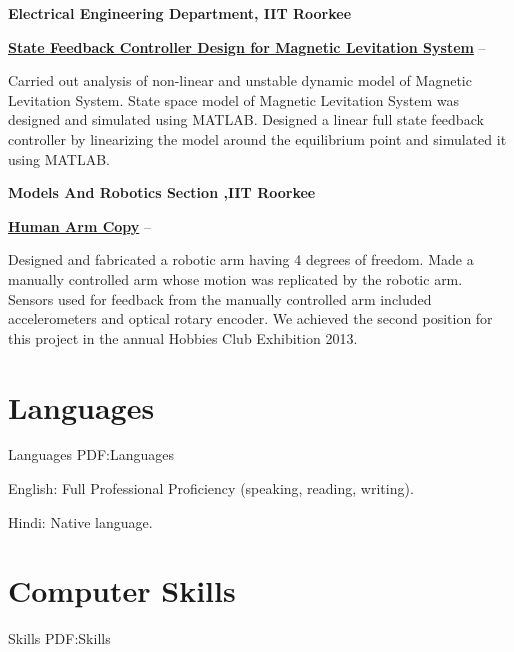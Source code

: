\documentclass[a4paper,10pt,oneside]{article}
\begin{document}
\begin{body}
{\EntryGap

{\textbf{Electrical Engineering Department, IIT Roorkee}}
\par
\href{https://drive.google.com/file/d/0B_52cv1ZRKUmQS1nVHp5WHRZUGM/view?usp=sharing}
{\textbf{State Feedback Controller Design for Magnetic Levitation System}}
\hfill
{} --
\begin{detail}
\BulletItem
Carried out analysis of non-linear and unstable dynamic model of Magnetic Levitation System. 
\BulletItem
State space model of Magnetic Levitation System was designed and simulated using MATLAB.
\BulletItem
Designed a linear full state feedback controller by linearizing the model around the equilibrium point and simulated it using MATLAB.
\end{detail}

\EntryGap

{\textbf{Models And Robotics Section ,IIT Roorkee}}
\par
\href{https://drive.google.com/file/d/0B_52cv1ZRKUmYlZXY2xYbGVYR3M/view?usp=sharing}
{\textbf{Human Arm Copy}}
\hfill
{} --
\begin{detail}
\BulletItem
Designed and fabricated a robotic arm having 4 degrees of freedom. 
\BulletItem
Made a manually controlled arm whose motion was replicated by the robotic arm. 
\BulletItem
Sensors used for feedback from the manually controlled arm included accelerometers and optical rotary encoder. 
\BulletItem
We achieved the second position for this project in the annual Hobbies Club Exhibition 2013.
\end{detail}




\section
{Languages}
{Languages}
{PDF:Languages}

English: Full Professional Proficiency (speaking, reading, writing).
\par
Hindi: Native language.


\section
{Computer \newline Skills}
{Skills}
{PDF:Skills}

}
\end{body}
\end{document}
